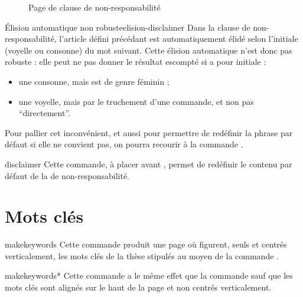 \begin{figure}[htbp]
  \centering
  \caption{Page de clause de non-responsabilité}
  \label{fig-disclaimerpage}
\end{figure}

\begin{dbwarning}{Élision automatique non robuste}{elision-disclaimer}
  Dans la clause de non-responsabilité, l'article défini précédant
   est automatiquement élidé selon l'initiale (voyelle ou
  consonne) du mot suivant. Cette élision automatique n'est donc pas robuste :
  elle peut ne pas donner le résultat escompté si  a pour
  initiale :
  \begin{itemize}
  \item une consonne, mais est de genre féminin ;
  \item une voyelle, mais par le truchement d'une commande\commandeacronyme, et
    non pas \enquote{directement}.
  \end{itemize}
\end{dbwarning}

Pour pallier cet inconvénient, et aussi pour permettre de redéfinir la phrase
par défaut si elle ne convient pas, on pourra recourir à la commande
.

\begin{docCommand}{disclaimer}{}
  Cette commande, à placer avant , permet de redéfinir
  le contenu par défaut de la  de non-responsabilité.
\end{docCommand}

\section{Mots clés}\label{sec-mots-cles}

\begin{docCommand}{makekeywords}{}
  Cette commande produit une page où figurent, seuls et centrés
  verticalement, les mots clés de la thèse stipulés au moyen de la commande
  .
\end{docCommand}
%
\begin{docCommand}{makekeywords*}{}
  Cette commande a le même effet que la commande
   sauf que les mots clés sont alignés sur le haut de la
  page et non centrés verticalement.
\end{docCommand}

